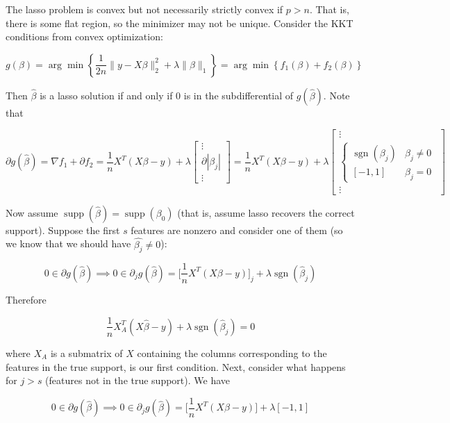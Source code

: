 The lasso problem is convex but not necessarily strictly convex if \(p > n\). That is, there is some flat region, so the minimizer may not be unique. Consider the KKT conditions from convex optimization:

\[
g(\beta) = \arg \min \left\{ \frac{1}{2n} \lVert y - X \beta \rVert_2^2 + \lambda \lVert \beta \rVert_1 \right\} =  \arg \min \left\{ f_1(\beta) + f_2(\beta) \right\}
\]

Then \(\hat{\beta}\) is a lasso solution if and only if 0 is in the subdifferential of \(g(\hat{\beta})\). Note that 

\[
\partial g(\hat{\beta}) = \nabla f_1 + \partial f_2 = \frac{1}{n} X^T(X \beta - y) + \lambda \begin{bmatrix}  \vdots \\ \partial | \beta_j | \\ \vdots \end{bmatrix} = \frac{1}{n} X^T(X \beta - y) + \lambda \begin{bmatrix}  \vdots \\ \begin{cases}  \operatorname{sgn}(\beta_j) & \beta_j \neq 0 \\ [-1, 1] & \beta_j = 0 \end{cases} \\ \vdots \end{bmatrix}
\]

Now assume \(\operatorname{supp}(\hat{\beta}) = \operatorname{supp}(\beta_0)\) (that is, assume lasso recovers the correct support). Suppose the first \(s\) features are nonzero and consider one of them (so we know that we should have \(\hat{\beta_j} \neq 0\)):

\[
0 \in \partial g(\hat{\beta}) \implies 0 \in \partial_j g(\hat{\beta}) = \bigg[ \frac{1}{n} X^T(X \beta - y) \bigg]_j + \lambda \operatorname{sgn}(\hat{\beta}_j) 
\]

Therefore

\begin{equation}\label{linreg.lasso.first.cond}
\frac{1}{n} X_A^T(X \hat{\beta} - y) + \lambda  \operatorname{sgn}(\hat{\beta}_j) = 0
\end{equation}

where \(X_A\) is a submatrix of \(X\) containing the columns corresponding to the features in the true support, is our first condition. Next, consider what happens for \(j > s\) (features not in the true support). We have

\[
0 \in \partial g(\hat{\beta}) \implies 0 \in \partial_j g(\hat{\beta}) = \bigg[ \frac{1}{n}X^T(X \beta - y) \bigg] + \lambda [-1, 1]
\]

